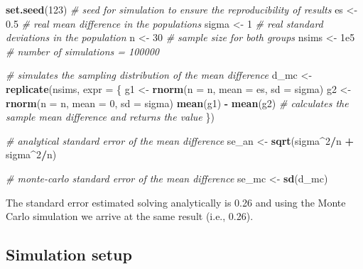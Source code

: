 \documentclass[
  man,floatsintext]{apa6}
\newenvironment{Shaded}{\begin{snugshade}}{\end{snugshade}}
\newcommand{\AttributeTok}[1]{\textcolor[rgb]{0.13,0.29,0.53}{#1}}
\newcommand{\CommentTok}[1]{\textcolor[rgb]{0.56,0.35,0.01}{\textit{#1}}}
\newcommand{\DecValTok}[1]{\textcolor[rgb]{0.00,0.00,0.81}{#1}}
\newcommand{\FloatTok}[1]{\textcolor[rgb]{0.00,0.00,0.81}{#1}}
\newcommand{\FunctionTok}[1]{\textcolor[rgb]{0.13,0.29,0.53}{\textbf{#1}}}
\newcommand{\NormalTok}[1]{#1}
\newcommand{\OtherTok}[1]{\textcolor[rgb]{0.56,0.35,0.01}{#1}}
\newcommand{\SpecialCharTok}[1]{\textcolor[rgb]{0.81,0.36,0.00}{\textbf{#1}}}
\begin{document}
\begin{Shaded}
\begin{Highlighting}[]
\FunctionTok{set.seed}\NormalTok{(}\DecValTok{123}\NormalTok{) }\CommentTok{\# seed for simulation to ensure the reproducibility of results}
\NormalTok{es }\OtherTok{\textless{}{-}} \FloatTok{0.5} \CommentTok{\# real mean difference in the populations}
\NormalTok{sigma }\OtherTok{\textless{}{-}} \DecValTok{1} \CommentTok{\# real standard deviations in the population}
\NormalTok{n }\OtherTok{\textless{}{-}} \DecValTok{30} \CommentTok{\# sample size for both groups}
\NormalTok{nsims }\OtherTok{\textless{}{-}} \FloatTok{1e5} \CommentTok{\# number of simulations = 100000}

\CommentTok{\# simulates the sampling distribution of the mean difference}
\NormalTok{d\_mc }\OtherTok{\textless{}{-}} \FunctionTok{replicate}\NormalTok{(nsims, }\AttributeTok{expr =}\NormalTok{ \{}
\NormalTok{  g1 }\OtherTok{\textless{}{-}} \FunctionTok{rnorm}\NormalTok{(}\AttributeTok{n =}\NormalTok{ n, }\AttributeTok{mean =}\NormalTok{ es, }\AttributeTok{sd =}\NormalTok{ sigma)}
\NormalTok{  g2 }\OtherTok{\textless{}{-}} \FunctionTok{rnorm}\NormalTok{(}\AttributeTok{n =}\NormalTok{ n, }\AttributeTok{mean =} \DecValTok{0}\NormalTok{, }\AttributeTok{sd =}\NormalTok{ sigma)}
  \FunctionTok{mean}\NormalTok{(g1) }\SpecialCharTok{{-}} \FunctionTok{mean}\NormalTok{(g2) }\CommentTok{\# calculates the sample mean difference and returns the value}
\NormalTok{\})}

\CommentTok{\# analytical standard error of the mean difference}
\NormalTok{se\_an }\OtherTok{\textless{}{-}} \FunctionTok{sqrt}\NormalTok{(sigma}\SpecialCharTok{\^{}}\DecValTok{2}\SpecialCharTok{/}\NormalTok{n }\SpecialCharTok{+}\NormalTok{ sigma}\SpecialCharTok{\^{}}\DecValTok{2}\SpecialCharTok{/}\NormalTok{n)}

\CommentTok{\# monte{-}carlo standard error of the mean difference}
\NormalTok{se\_mc }\OtherTok{\textless{}{-}} \FunctionTok{sd}\NormalTok{(d\_mc)}
\end{Highlighting}
\end{Shaded}

\normalsize

The standard error estimated solving analytically is 0.26 and using the Monte Carlo simulation we arrive at the same result (i.e., 0.26).

\hypertarget{simulation-setup}{%
\subsection{Simulation setup}\label{simulation-setup}}
\end{document}
